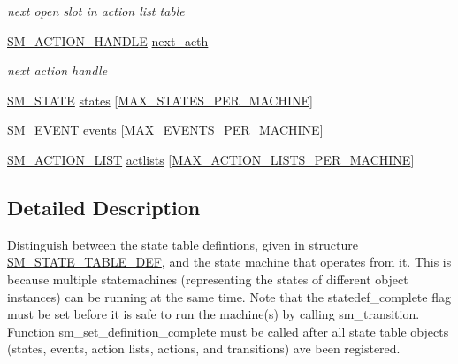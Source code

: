 \begin{DoxyCompactItemize}
\begin{DoxyCompactList}\small\item\em next open slot in action list table \end{DoxyCompactList}\item 
\hyperlink{statemachine_8h_a49cb86c3ee19747e43ffc473b6ba14a0}{S\-M\-\_\-\-A\-C\-T\-I\-O\-N\-\_\-\-H\-A\-N\-D\-L\-E} \hyperlink{struct_s_m___s_t_a_t_e___t_a_b_l_e___d_e_f_a5e4f2552c121238148c32b9d4b663b1b}{next\-\_\-acth}
\begin{DoxyCompactList}\small\item\em next action handle \end{DoxyCompactList}\item 
\hyperlink{statemachine_8h_a28c039f37e40bf52b3b563ceab338577}{S\-M\-\_\-\-S\-T\-A\-T\-E} \hyperlink{struct_s_m___s_t_a_t_e___t_a_b_l_e___d_e_f_a890467ba9a24f77386c5830e1bb1dc37}{states} \mbox{[}\hyperlink{statemachine_8h_aa84c707254ca41f03f93d08cf1bffd84}{M\-A\-X\-\_\-\-S\-T\-A\-T\-E\-S\-\_\-\-P\-E\-R\-\_\-\-M\-A\-C\-H\-I\-N\-E}\mbox{]}
\item 
\hyperlink{statemachine_8h_a3f5444632a5a5fae6c85d5aa09002cfb}{S\-M\-\_\-\-E\-V\-E\-N\-T} \hyperlink{struct_s_m___s_t_a_t_e___t_a_b_l_e___d_e_f_a0ead43d89832f9888dd4f3503c7b5e43}{events} \mbox{[}\hyperlink{statemachine_8h_ad657826ec80658ad3c1822dcc9aafe7f}{M\-A\-X\-\_\-\-E\-V\-E\-N\-T\-S\-\_\-\-P\-E\-R\-\_\-\-M\-A\-C\-H\-I\-N\-E}\mbox{]}
\item 
\hyperlink{statemachine_8h_a96169f2f87b48730c60b516e164e5adf}{S\-M\-\_\-\-A\-C\-T\-I\-O\-N\-\_\-\-L\-I\-S\-T} \hyperlink{struct_s_m___s_t_a_t_e___t_a_b_l_e___d_e_f_a2d009396b23b93fbc7cd65d7604206af}{actlists} \mbox{[}\hyperlink{statemachine_8h_ac9327c97e20bb488c395b93f3fda2ffa}{M\-A\-X\-\_\-\-A\-C\-T\-I\-O\-N\-\_\-\-L\-I\-S\-T\-S\-\_\-\-P\-E\-R\-\_\-\-M\-A\-C\-H\-I\-N\-E}\mbox{]}
\end{DoxyCompactItemize}


\subsection{Detailed Description}
Distinguish between the state table defintions, given in structure \hyperlink{struct_s_m___s_t_a_t_e___t_a_b_l_e___d_e_f}{S\-M\-\_\-\-S\-T\-A\-T\-E\-\_\-\-T\-A\-B\-L\-E\-\_\-\-D\-E\-F}, and the state machine that operates from it. This is because multiple statemachines (representing the states of different object instances) can be running at the same time. Note that the statedef\-\_\-complete flag must be set before it is safe to run the machine(s) by calling sm\-\_\-transition. Function sm\-\_\-set\-\_\-definition\-\_\-complete must be called after all state table objects (states, events, action lists, actions, and transitions) ave been registered.

